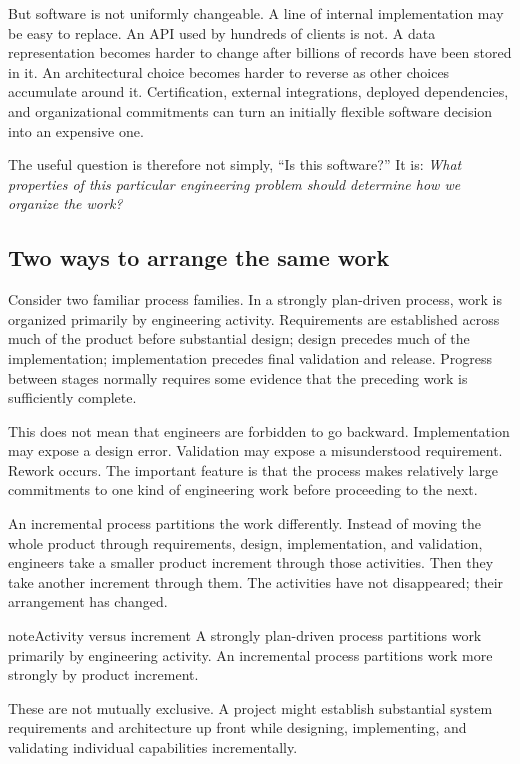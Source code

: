 But software is not uniformly changeable. A line of internal implementation may be easy to replace. An
API used by hundreds of clients is not. A data representation becomes harder to change after billions of
records have been stored in it. An architectural choice becomes harder to reverse as other choices
accumulate around it. Certification, external integrations, deployed dependencies, and organizational
commitments can turn an initially flexible software decision into an expensive one.

The useful question is therefore not simply, ``Is this software?'' It is: \emph{What properties of this
particular engineering problem should determine how we organize the work?}

\subsection{Two ways to arrange the same work}\label{sec-two-ways}

Consider two familiar process families. In a strongly plan-driven process, work is organized
primarily by engineering activity. Requirements are
established across much of the product before substantial design; design precedes much of the
implementation; implementation precedes final validation and release. Progress between stages normally
requires some evidence that the preceding work is sufficiently complete.

This does not mean that engineers are forbidden to go backward. Implementation may expose a design error.
Validation may expose a misunderstood requirement. Rework occurs. The important feature is that the
process makes relatively large commitments to one kind of engineering work before proceeding to the next.

An incremental process partitions the work differently. Instead of moving the whole product through
requirements, design, implementation, and validation, engineers take a smaller product increment through
those activities. Then they take another increment through them. The activities have not
disappeared; their arrangement has changed.

\begin{bookbox}{note}{Activity versus increment} %
A strongly plan-driven process partitions work primarily by engineering activity. An incremental process
partitions work more strongly by product increment.
\end{bookbox}

These are not mutually exclusive. A project might establish substantial system requirements and
architecture up front while designing, implementing, and validating individual capabilities
incrementally.

